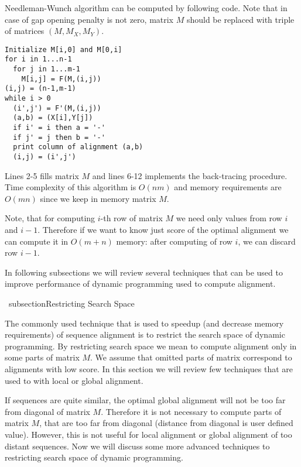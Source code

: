 Needleman-Wunch algorithm can be computed by following code. Note that in case
of gap opening penalty is not zero, matrix $M$ should be replaced with triple of
matrices $(M,M_X,M_Y)$. 

\lstset{showstringspaces=false}
\begin{lstlisting}
Initialize M[i,0] and M[0,i]
for i in 1...n-1
  for j in 1...m-1
    M[i,j] = F(M,(i,j))
(i,j) = (n-1,m-1)
while i > 0
  (i',j') = F'(M,(i,j))
  (a,b) = (X[i],Y[j])
  if i' = i then a = '-'
  if j' = j then b = '-'
  print column of alignment (a,b)
  (i,j) = (i',j')
\end{lstlisting}

Lines 2-5 fills matrix $M$ and lines 6-12 implements the back-tracing procedure.
Time complexity of this algorithm is $O(nm)$ and memory requirements are $O(mn)$
since we keep in memory matrix $M$.

Note, that for computing $i$-th row of matrix $M$ we need only values from row
$i$ and $i-1$. Therefore if we want to know just score of the optimal alignment
we can compute it in $O(m+n)$ memory: after computing of row $i$, we can discard
row $i-1$.

In following subsections we will review several techniques that can be used to
improve performance of dynamic programming used to compute alignment.

\ subsection{Restricting Search Space}

The commonly used technique that is used to speedup (and decrease memory
requirements) of sequence alignment is to restrict the search space of dynamic
programming. By restricting search space we mean to compute alignment only in
some parts of matrix $M$. We assume that omitted parts of matrix correspond to
alignments with low score. In this section we will review few techniques that are
used to with local or global alignment.

If sequences are quite similar, the optimal global alignment will not be too far
from diagonal of matrix $M$. Therefore it is not necessary to compute parts of
matrix $M$, that are too far from diagonal (distance from diagonal is user
defined value). However, this is not useful for local alignment or global
alignment of too distant sequences. Now we will discuss some more advanced
techniques to restricting search space of dynamic programming.

